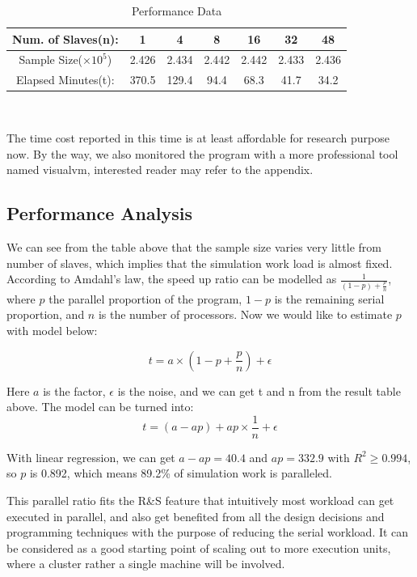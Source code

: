 \documentclass[12pt,a4paper]{report}
\begin{document}
\begin{table}[ht]
\begin{center}
\begin{tabular}{|c|c|c|c|c|c|c|}
\hline
Num. of Slaves(n): & 1 & 4 & 8 & 16 & 32 & 48 \\
\hline
Sample Size($\times 10^5$) & 2.426 & 2.434 & 2.442 & 2.442 & 2.433 & 2.436\\
\hline
Elapsed Minutes(t): & 370.5 & 129.4 & 94.4 & 68.3 & 41.7 & 34.2 \\
\hline
\end{tabular} \\
\caption{Performance Data}
\end{center}
\end{table}

The time cost reported in this time is at least affordable for research purpose now. By the way, we also monitored the program with a more professional tool named visualvm, interested reader may refer to the appendix.

\subsection{Performance Analysis}

We can see from the table above that the sample size varies very little from number of slaves, which implies that the simulation work load is almost fixed. According to Amdahl's law, the speed up ratio can be modelled as $\frac{1}{(1 - p) + \frac{p}{n}}$, where $p$ the parallel proportion of the program, $1 - p$ is the remaining serial proportion, and $n$ is the number of processors. Now we would like to estimate $p$ with model below:

$$ t = a \times (1 - p + \frac{p}{n}) + \epsilon $$

Here $a$ is the factor, $\epsilon$ is the noise, and we can get t and n from the result table above. The model can be turned into: 
$$ t = (a - ap) + ap \times \frac{1}{n} + \epsilon $$

With linear regression, we can get $a - ap = 40.4$ and $ap = 332.9$ with $R^2 \geqslant 0.994$, so $p$ is 0.892, which means 89.2\% of simulation work is paralleled.

This parallel ratio fits the R\&S feature that intuitively most workload can get executed in parallel, and also get benefited from all the design decisions and programming techniques with the purpose of reducing the serial workload. It can be considered as a good starting point of scaling out to more execution units, where a cluster rather a single machine will be involved.
\end{document}
